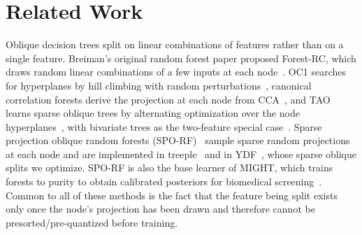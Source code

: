 \documentclass[sigconf]{acmart}%
\newcommand{\TODO}[1]{\textbf{\textcolor{red}{#1}}}
\begin{document}








\section{Related Work}

Oblique decision trees split on linear combinations of features rather than on a single feature. Breiman's original random forest paper proposed Forest-RC, which draws random linear combinations of a few inputs at each node~\cite{breiman}. OC1 searches for hyperplanes by hill climbing with random perturbations~\cite{murthy1994system}, canonical correlation forests derive the projection at each node from CCA~\cite{rainforth2015canonical}, and TAO learns sparse oblique trees by alternating optimization over the node hyperplanes~\cite{carreira2018alternating}, with bivariate trees as the two-feature special case~\cite{kairgeldin_bivariate_2024}. Sparse projection oblique random forests (SPO-RF)~\cite{tomita2020sparse} sample sparse random projections at each node and are implemented in treeple~\cite{treeple} and in YDF~\cite{ydf}, whose sparse oblique splits we optimize. SPO-RF is also the base learner of MIGHT, which trains forests to purity to obtain calibrated posteriors for biomedical screening~\cite{might1,might2}. Common to all of these methods is the fact that the feature being split exists only once the node's projection has been drawn and therefore cannot be presorted/pre-quantized before training.
\end{document}
